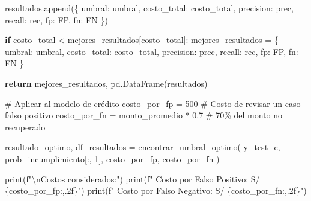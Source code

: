 \documentclass[
  doc,
  floatsintext,
  longtable,
  a4paper,
  nolmodern,
  notxfonts,
  notimes,
  12pt,
  colorlinks=true,linkcolor=blue,citecolor=blue,urlcolor=blue]{apa7}
\newenvironment{Shaded}{\begin{snugshade}}{\end{snugshade}}
\newcommand{\BuiltInTok}[1]{\textcolor[rgb]{0.00,0.23,0.31}{#1}}
\newcommand{\CharTok}[1]{\textcolor[rgb]{0.13,0.47,0.30}{#1}}
\newcommand{\CommentTok}[1]{\textcolor[rgb]{0.37,0.37,0.37}{#1}}
\newcommand{\ControlFlowTok}[1]{\textcolor[rgb]{0.00,0.23,0.31}{\textbf{#1}}}
\newcommand{\DecValTok}[1]{\textcolor[rgb]{0.68,0.00,0.00}{#1}}
\newcommand{\FloatTok}[1]{\textcolor[rgb]{0.68,0.00,0.00}{#1}}
\newcommand{\NormalTok}[1]{\textcolor[rgb]{0.00,0.23,0.31}{#1}}
\newcommand{\OperatorTok}[1]{\textcolor[rgb]{0.37,0.37,0.37}{#1}}
\newcommand{\SpecialCharTok}[1]{\textcolor[rgb]{0.37,0.37,0.37}{#1}}
\newcommand{\SpecialStringTok}[1]{\textcolor[rgb]{0.13,0.47,0.30}{#1}}
\newcommand{\StringTok}[1]{\textcolor[rgb]{0.13,0.47,0.30}{#1}}
\begin{document}
\begin{Shaded}
\begin{Highlighting}[]
\NormalTok{        resultados.append(\{}
            \StringTok{\textquotesingle{}umbral\textquotesingle{}}\NormalTok{: umbral,}
            \StringTok{\textquotesingle{}costo\_total\textquotesingle{}}\NormalTok{: costo\_total,}
            \StringTok{\textquotesingle{}precision\textquotesingle{}}\NormalTok{: prec,}
            \StringTok{\textquotesingle{}recall\textquotesingle{}}\NormalTok{: rec,}
            \StringTok{\textquotesingle{}fp\textquotesingle{}}\NormalTok{: FP,}
            \StringTok{\textquotesingle{}fn\textquotesingle{}}\NormalTok{: FN}
\NormalTok{        \})}
        
        \ControlFlowTok{if}\NormalTok{ costo\_total }\OperatorTok{\textless{}}\NormalTok{ mejores\_resultados[}\StringTok{\textquotesingle{}costo\_total\textquotesingle{}}\NormalTok{]:}
\NormalTok{            mejores\_resultados }\OperatorTok{=}\NormalTok{ \{}
                \StringTok{\textquotesingle{}umbral\textquotesingle{}}\NormalTok{: umbral,}
                \StringTok{\textquotesingle{}costo\_total\textquotesingle{}}\NormalTok{: costo\_total,}
                \StringTok{\textquotesingle{}precision\textquotesingle{}}\NormalTok{: prec,}
                \StringTok{\textquotesingle{}recall\textquotesingle{}}\NormalTok{: rec,}
                \StringTok{\textquotesingle{}fp\textquotesingle{}}\NormalTok{: FP,}
                \StringTok{\textquotesingle{}fn\textquotesingle{}}\NormalTok{: FN}
\NormalTok{            \}}
    
    \ControlFlowTok{return}\NormalTok{ mejores\_resultados, pd.DataFrame(resultados)}

\CommentTok{\# Aplicar al modelo de crédito}
\NormalTok{costo\_por\_fp }\OperatorTok{=} \DecValTok{500}  \CommentTok{\# Costo de revisar un caso falso positivo}
\NormalTok{costo\_por\_fn }\OperatorTok{=}\NormalTok{ monto\_promedio }\OperatorTok{*} \FloatTok{0.7}  \CommentTok{\# 70\% del monto no recuperado}

\NormalTok{resultado\_optimo, df\_resultados }\OperatorTok{=}\NormalTok{ encontrar\_umbral\_optimo(}
\NormalTok{    y\_test\_c, }
\NormalTok{    prob\_incumplimiento[:, }\DecValTok{1}\NormalTok{],}
\NormalTok{    costo\_por\_fp,}
\NormalTok{    costo\_por\_fn}
\NormalTok{)}

\BuiltInTok{print}\NormalTok{(}\SpecialStringTok{f"}\CharTok{\textbackslash{}n}\SpecialStringTok{Costos considerados:"}\NormalTok{)}
\BuiltInTok{print}\NormalTok{(}\SpecialStringTok{f"  Costo por Falso Positivo: S/ }\SpecialCharTok{\{}\NormalTok{costo\_por\_fp}\SpecialCharTok{:,.2f\}}\SpecialStringTok{"}\NormalTok{)}
\BuiltInTok{print}\NormalTok{(}\SpecialStringTok{f"  Costo por Falso Negativo: S/ }\SpecialCharTok{\{}\NormalTok{costo\_por\_fn}\SpecialCharTok{:,.2f\}}\SpecialStringTok{"}\NormalTok{)}


\end{Highlighting}
\end{Shaded}
\end{document}
